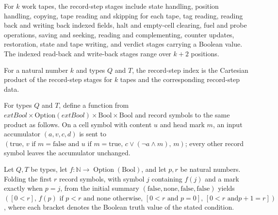 \begin{definition}
\label{Turing.RecordStepStage}
\leanok
For $k$ work tapes, the record-step stages include state handling, position handling,
copying, tape reading and skipping for each tape, tag reading, reading back and writing
back indexed fields, halt and empty-cell clearing, fuel and probe operations, saving and
seeking, reading and complementing, counter updates, restoration, state and tape
writing, and verdict stages carrying a Boolean value. The indexed read-back and
write-back stages range over $k+2$ positions.
\end{definition}

\begin{definition}
\label{Turing.RecordStepIndex}
\leanok
{}
For a natural number $k$ and types $Q$ and $T$, the record-step index is the Cartesian
product of the record-step stages for $k$ tapes and the corresponding record-step data.
\end{definition}

\begin{definition}
\label{Turing.recordStepTapeFold}
\leanok
{}
For types $Q$ and $T$, define a function from $	ext{Bool} \times
\text{Option}(	ext{Bool}) \times \text{Bool} \times \text{Bool}$ and record symbols to
the same product as follows. On a cell symbol with content $u$ and head mark $m$, an
input accumulator $(a,v,c,d)$ is sent to $(\mathrm{true},\, v \text{ if }
m=\mathrm{false} \text{ and } u \text{ if } m=\mathrm{true},\, c \lor (\neg a \land
m),\, m)$; every other record symbol leaves the accumulator unchanged.
\end{definition}

\begin{theorem}
\label{Turing.recordStep_tape_prefix}
\leanok
{}
Let $Q,T$ be types, let $f:\mathbb{N}\to\operatorname{Option}(\mathrm{Bool})$, and let
$p,r$ be natural numbers. Folding the first $r$ record symbols, with symbol $j$
containing $f(j)$ and a mark exactly when $p=j$, from the initial summary
$(\mathrm{false},\mathrm{none},\mathrm{false},\mathrm{false})$ yields $( [0<r],\,
f(p)\text{ if }p<r\text{ and none otherwise},\, [0<r\text{ and }p=0],\, [0<r\text{ and
}p+1=r])$, where each bracket denotes the Boolean truth value of the stated condition.
\end{theorem}


